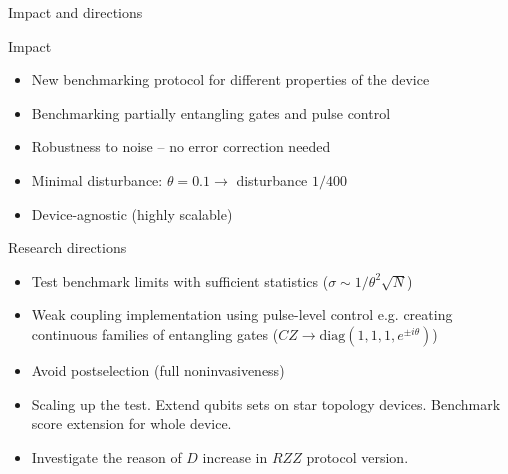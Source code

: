 \documentclass{beamer}
\begin{document}
	\begin{frame}{Impact and directions}
		
		\vspace{-0.3cm}
		
		\begin{block}{Impact}
			\begin{itemize}
				
				\item New benchmarking protocol for different properties of the device
				
				\item Benchmarking partially entangling gates and pulse control
				
				\item Robustness to noise -- no error correction needed
				
				\item Minimal disturbance: $\theta=0.1 \to $ disturbance $1/400$
				
				\item Device-agnostic (highly scalable)
				
			\end{itemize}
		\end{block}
	
		\vspace{-0.2cm}
		
		\begin{block}{Research directions}

			\begin{itemize}

				\item Test benchmark limits with sufficient statistics ($\sigma\sim 1/\theta^2\sqrt{N}$)
				
				\item Weak coupling implementation using pulse-level control
				e.g. creating continuous families of entangling gates ($CZ\to \mathrm{diag}(1,1,1,e^{\pm i\theta})$)
				
				\item Avoid postselection (full noninvasiveness)
				
				\item Scaling up the test. Extend qubits sets on star topology
				devices. Benchmark score extension for whole device.
				
				\item Investigate the reason of $D$ increase in $RZZ$ protocol version.
				
			\end{itemize}
		\end{block}
		
	\end{frame}
\end{document}

